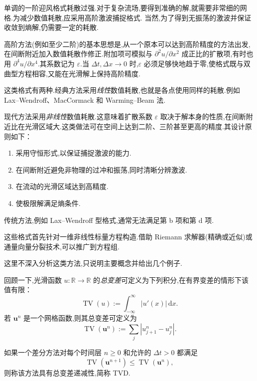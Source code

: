 单调的一阶迎风格式耗散过强.对于复杂流场,要得到准确的解,就需要非常细的网格.为减少数值耗散,应采用高阶激波捕捉格式.
当然,为了得到无振荡的激波并保证收敛到熵解,仍需要一定的耗散.

高阶方法(例如至少二阶)的基本思想是,从一个原本可以达到高阶精度的方法出发,在间断附近加入数值耗散作修正.附加项可模拟与 \(\partial^2u/\partial x^2\) 成正比的扩散项,有时也用 \(\partial^4u/\partial x^4\).其系数记为 \(\varepsilon\).当 \(\Delta t,\Delta x\to0\) 时,\(\varepsilon\) 必须足够快地趋于零,使格式既与双曲型方程相容,又能在光滑解上保持高阶精度.

这类格式有两种.经典方法采用\emph{线性}数值耗散,也就是各点使用同样的耗散.例如 Lax--Wendroff、MacCormack 和 Warming--Beam 法.

现代方法采用\emph{非线性}数值耗散.这意味着扩散系数 \(\varepsilon\) 取决于解本身的性质,在间断附近比在光滑区域大.这类做法可在空间上达到二阶、三阶甚至更高的精度.其设计原则如下：
\begin{enumerate}[label=\alph*.]
  \item 采用守恒形式,以保证捕捉激波的能力.
  \item 在间断附近避免非物理的过冲和振荡,同时清晰分辨激波.
  \item 在流动的光滑区域达到高精度.
  \item 使极限解满足熵条件.
\end{enumerate}
传统方法,例如 Lax--Wendroff 型格式,通常无法满足第 b 项和第 d 项.

这些格式首先针对一维非线性标量方程构造.借助 Riemann 求解器(精确或近似)或通量向量分裂技术,可以推广到方程组.

这里不深入分析这类方法,只说明主要概念并给出几个例子.

回顾一下,光滑函数 \(u\colon\mathbb R\to\mathbb R\) 的\emph{总变差}可定义为下列积分,在有界变差的情形下该值有限：
\[
  \operatorname{TV}(u):=\int_{-\infty}^{\infty}|u'(x)|\,\mathrm dx.
\]
若 \(\boldsymbol{u}^n\) 是一个网格函数,则其总变差可定义为
\begin{equation}\label{eq:14.2.33}
  \operatorname{TV}(\boldsymbol{u}^n):=\sum_j|u_{j+1}^n-u_j^n|.
\end{equation}
\begin{definition*}
如果一个差分方法对每个时间层 \(n\ge0\) 和允许的 \(\Delta t>0\) 都满足
\begin{equation}\label{eq:14.2.34}
  \operatorname{TV}(\boldsymbol{u}^{n+1})\le\operatorname{TV}(\boldsymbol{u}^n),
\end{equation}
则称该方法具有{\heiti 总变差递减性},简称 TVD.
\end{definition*}

